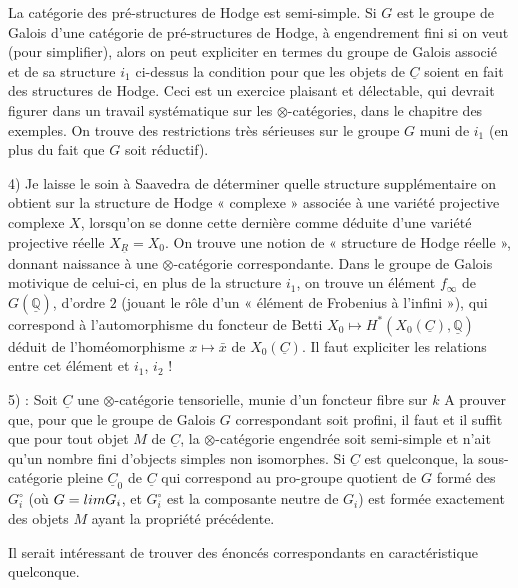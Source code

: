 \documentclass[11pt,a4paper]{article}
\begin{document}
La catégorie des pré-structures de Hodge est semi-simple. Si $G$ est le groupe
de Galois d'une \supplied{$\otimes$-}catégorie  de
pré-structures de Hodge, à engendrement fini si on veut (pour simplifier),
alors on peut expliciter en termes du groupe de Galois associé et de sa
structure $i_{1}$ ci-dessus la condition pour que les objets de
$\underline{C}$ soient en fait des structures de Hodge. Ceci est un exercice
plaisant et délectable, qui devrait figurer dans un travail systématique sur
les $\otimes$-catégories, dans le chapitre des exemples. On trouve des
restrictions très sérieuses sur le groupe $G$ muni de $i_{1}$ (en plus du fait
que $G$ soit réductif).

4) Je laisse le soin à Saavedra de déterminer quelle structure supplémentaire
on obtient sur la structure de Hodge « complexe » associée à une variété
projective  complexe $X$, lorsqu'on se donne cette dernière comme
déduite d'une variété projective réelle $X_{\underline{R}} = X_{0}$. On trouve
une notion de « structure de Hodge réelle », donnant naissance à une
$\otimes$-catégorie correspondante. Dans le groupe de Galois motivique de
celui-ci, en plus de la structure $i_{1}$, on trouve un élément $f_{\infty}$
de $G(\underline{\mathbb{Q}})$,  d'ordre $2$ (jouant le rôle
d'un « élément de Frobenius à l'infini »), qui correspond à l'automorphisme du
foncteur de Betti
$X_{0} \longmapsto H^{*}(X_{0}(\underline{C}), \underline{\mathbb{Q}})$ déduit
de l'homéomorphisme $x \mapsto \bar{x}$ de $X_{0}(\underline{C})$. Il faut
expliciter les relations entre cet élément et $i_{1}$, $i_{2}$ !

5) : Soit $\underline{C}$ une $\otimes$-catégorie tensorielle,
\struck{\ill{}} munie d'un foncteur fibre sur $k$  A prouver que, pour que le groupe de Galois $G$ correspondant soit
profini, il faut et il suffit que pour tout objet $M$ de $\underline{C}$, la
$\otimes$-catégorie engendrée soit semi-simple et n'ait qu'un nombre fini
d'objects simples non isomorphes. Si $\underline{C}$ est quelconque, la
sous-catégorie pleine $\underline{C}_{0}$ de $\underline{C}$ qui correspond au
pro-groupe quotient de $G$ formé des $G_{i}^{\circ}$ (où
$G = \varprojlim G_{i}$, et $G_{i}^{\circ}$ est la composante neutre de
$G_{i}$) est formée exactement des objets $M$ ayant la propriété précédente.

Il serait intéressant de trouver des énoncés correspondants en caractéristique
quelconque.
\end{document}

